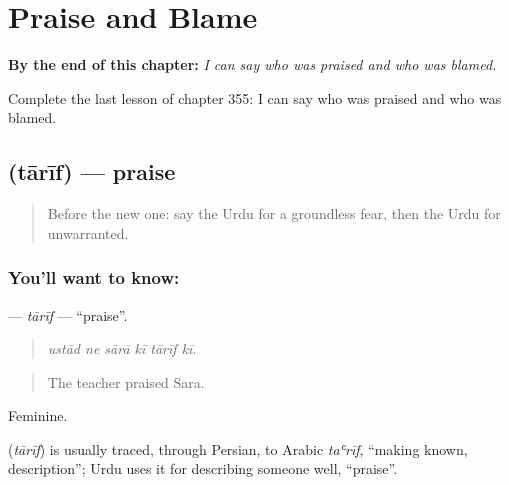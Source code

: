 
\chapter{Praise and Blame}
\label{ch:ur-praise-and-blame}

\begin{chapteropening}
\textbf{By the end of this chapter:} \emph{I can say who was praised and who was blamed.}

Complete the last lesson of chapter 355: I can say who was praised and who was blamed.
\end{chapteropening}

\section[\texorpdfstring{\ur{تعریف} (tārīf)}{تعریف (tārīf)}]{ (tārīf) — praise}

\label{lesson:UR-C355-tarif}



\begin{quote}
Before the new one: say the Urdu for a groundless fear, then the Urdu for unwarranted.
\end{quote}

\subsection*{You'll want to know: }
\textbf{} — \emph{tārīf} — \textquotedblleft{}praise\textquotedblright{}.

\begin{quote}
     
\end{quote}

\begin{quote}
\emph{ustād ne sārā kī tārīf kī.}
\end{quote}

\begin{quote}
The teacher praised Sara.
\end{quote}

Feminine.

\begin{cousinweb}
\textbf{} (\emph{tārīf}) is usually traced, through Persian, to Arabic \emph{taʿrīf}, \textquotedblleft{}making known, description\textquotedblright{}; Urdu uses it for describing someone well, \textquotedblleft{}praise\textquotedblright{}.
\end{cousinweb}

